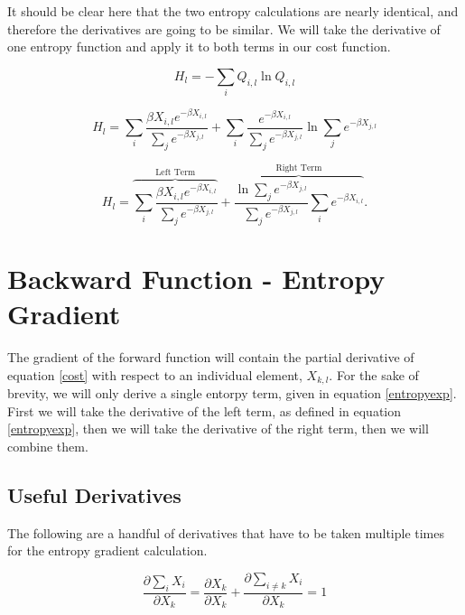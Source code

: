 \noindent It should be clear here that the two entropy calculations are nearly identical, and therefore the derivatives are going to be similar. We will take the derivative of one entropy function and apply it to both terms in our cost function.

\begin{displaymath}
    H_{l} = - \sum_{i} Q_{i,l} \ln Q_{i,l}
\end{displaymath}

\begin{displaymath}
    H_{l} =
    \sum_{i}\frac{\beta X_{i,l} e^{-\beta X_{i,l}}}{\sum_{j}e^{-\beta X_{j,l}}} + 
    \sum_{i}\frac{e^{-\beta X_{i,l}}}{\sum_{j}e^{-\beta X_{j,l}}}\ln{\sum_{j}e^{-\beta X_{j,l}}}
\end{displaymath}

\begin{equation} \label{entropyexp}
    H_{l} =
    \overbrace{\sum_{i}\frac{\beta X_{i,l}e^{-\beta X_{i,l}}}{\sum_{j}e^{-\beta X_{j,l}}}}^\text{Left Term} + 
    \overbrace{\frac{\ln{\sum_{j}e^{-\beta X_{j,l}}}}{\sum_{j}e^{-\beta X_{j,l}}}\sum_{i}e^{-\beta X_{i,l}}}^\text{Right Term}.
\end{equation}

\section{Backward Function - Entropy Gradient} \label{backward}
\noindent The gradient of the forward function will contain the partial derivative of equation \ref{cost} with respect to an individual element, $X_{k,l}$. For the sake of brevity, we will only derive a single entorpy term, given in equation \ref{entropyexp}. First we will take the derivative of the left term, as defined in equation \ref{entropyexp}, then we will take the derivative of the right term, then we will combine them.

\subsection{Useful Derivatives} \label{derivatives}
\noindent The following are a handful of derivatives that have to be taken multiple times for the entropy gradient calculation.

\begin{equation} \label{dx}
    \frac{\partial\sum_{i}X_i}{\partial X_{k}} = \frac{\partial X_{k}}{\partial X_{k}} + \frac{\partial \sum_{i \ne k} X_{i}}{\partial X_{k}} = 1
\end{equation}

